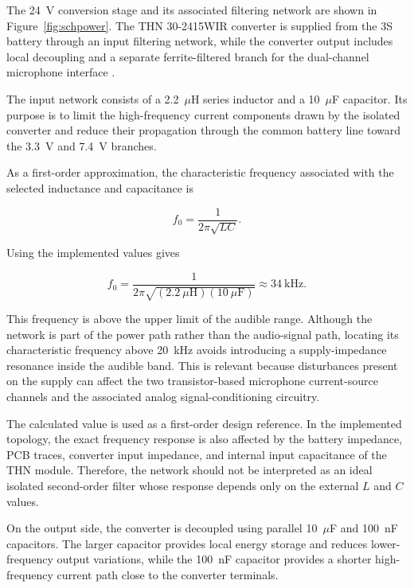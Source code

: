 The 24~V conversion stage and its associated filtering network are shown in Figure~\ref{fig:schpower}. The THN 30-2415WIR converter is supplied from the 3S battery through an input filtering network, while the converter output includes local decoupling and a separate ferrite-filtered branch for the dual-channel microphone interface \cite{TracoTHN30WIR}.

The input network consists of a 2.2~$\mu$H series inductor and a 10~$\mu$F capacitor. Its purpose is to limit the high-frequency current components drawn by the isolated converter and reduce their propagation through the common battery line toward the 3.3~V and 7.4~V branches.

As a first-order approximation, the characteristic frequency associated with the selected inductance and capacitance is

\begin{equation}
f_0 =
\frac{1}{2\pi\sqrt{LC}}.
\end{equation}

Using the implemented values gives

\begin{equation}
f_0 =
\frac{1}
{2\pi\sqrt{(2.2~\mu\mathrm{H})(10~\mu\mathrm{F})}}
\approx 34~\mathrm{kHz}.
\end{equation}

This frequency is above the upper limit of the audible range. Although the network is part of the power path rather than the audio-signal path, locating its characteristic frequency above 20~kHz avoids introducing a supply-impedance resonance inside the audible band. This is relevant because disturbances present on the supply can affect the two transistor-based microphone current-source channels and the associated analog signal-conditioning circuitry.

The calculated value is used as a first-order design reference. In the implemented topology, the exact frequency response is also affected by the battery impedance, PCB traces, converter input impedance, and internal input capacitance of the THN module. Therefore, the network should not be interpreted as an ideal isolated second-order filter whose response depends only on the external $L$ and $C$ values.

On the output side, the converter is decoupled using parallel 10~$\mu$F and 100~nF capacitors. The larger capacitor provides local energy storage and reduces lower-frequency output variations, while the 100~nF capacitor provides a shorter high-frequency current path close to the converter terminals.

